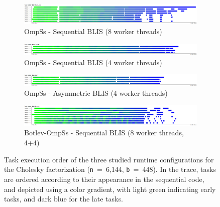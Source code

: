 \begin{figure}%
\centering
	\begin{subfigure}{\textwidth}
   \includegraphics[width=\textwidth]{Plots/Traces/sym_8cores_task_number.png}
		\caption{OmpSs - Sequential BLIS (8 worker threads)}
	\end{subfigure}
	\begin{subfigure}{\textwidth}
   \includegraphics[width=\textwidth]{Plots/Traces/sym_task_number.png}
		\caption{OmpSs - Sequential BLIS (4 worker threads)} 
	\end{subfigure}
	\begin{subfigure}{\textwidth}
   \includegraphics[width=\textwidth]{Plots/Traces/asym_task_number.png}
		\caption{OmpSs - Asymmetric BLIS (4 worker threads)} 
	\end{subfigure}
	\begin{subfigure}{\textwidth}
   \includegraphics[width=\textwidth]{Plots/Traces/botlev_task_number.png}
		\caption{Botlev-OmpSs - Sequential BLIS (8 worker threads, 4+4)} 
	\end{subfigure}
\caption{Task execution order of the three studied runtime configurations for the Cholesky factorization 
({\tt n}~=~6,144, {\tt b}~=~448). In the trace, tasks are ordered
according to their appearance in the sequential code, 
and depicted using a color gradient, with light green indicating early tasks, and dark blue for the late
tasks. 
}
\label{fig:traces_task_number}
\end{figure}

